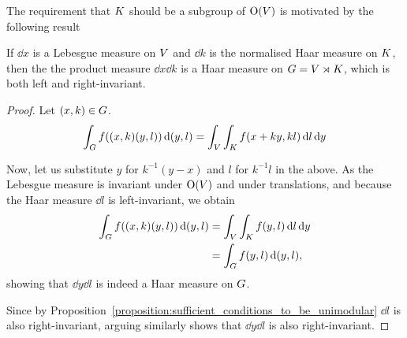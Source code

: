 The requirement that $K$ should be a subgroup of ${\mathrm{O} (V)}$ is motivated by the following result

\begin{lemma}
\label{lemma:Haar_measure}
    If $\dd x$ is a Lebesgue measure on $V$ and $\dd k$ is the normalised Haar measure on $K$,
    then the the product measure $\dd x \dd k$ is a Haar measure on $G = V \rtimes K$,
    which is both left and right-invariant.
\end{lemma}
\begin{proof}
    Let $(x, k) \in G$.
    \begin{align*}
        \int_G f((x, k) (y, l)) \,\mathrm{d} (y, l)
        = \int_V \int_K f(x + ky, k l) \,\mathrm{d} l \,\mathrm{d} y
    \end{align*}

    Now, let us substitute $y$ for $k^{-1}(y - x)$ and $l$ for $k^{-1} l$ in the above.
    As the Lebesgue measure is invariant under ${\mathrm{O} (V)}$ and under translations,
    and because the Haar measure $\dd l$ is left-invariant,
    we obtain
    \begin{align*}
        \int_G f((x, k) (y, l)) \,\mathrm{d} (y, l)
        &= \int_V \int_K f(y, l) \,\mathrm{d} l \,\mathrm{d} y\\
        &= \int_G f(y, l) \,\mathrm{d} (y, l),
    \end{align*}
    showing that $\dd y \dd l$ is indeed a Haar measure on $G$.

    Since by Proposition~\ref{proposition:sufficient_conditions_to_be_unimodular} $\dd l$ is also right-invariant,
    arguing similarly shows that $\dd y \dd l$ is also right-invariant.
\end{proof}

